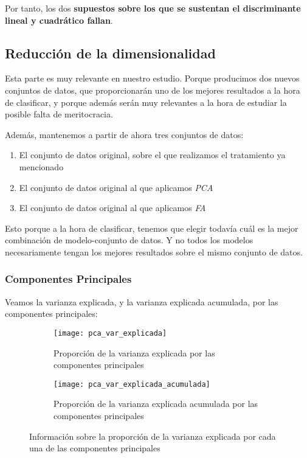 Por tanto, los dos \textbf{supuestos sobre los que se sustentan el discriminante lineal y cuadrático fallan}.


\subsection{Reducción de la dimensionalidad}

Esta parte es muy relevante en nuestro estudio. Porque producimos dos nuevos conjuntos de datos, que proporcionarán uno de los mejores resultados a la hora de clasificar, y porque además serán muy relevantes a la hora de estudiar la posible falta de meritocracia.

Además, mantenemos a partir de ahora tres conjuntos de datos:

\begin{enumerate}
    \item El conjunto de datos original, sobre el que realizamos el tratamiento ya mencionado
    \item El conjunto de datos original al que aplicamos \textit{PCA}
    \item El conjunto de datos original al que aplicamos \textit{FA}
\end{enumerate}

Esto porque a la hora de clasificar, tenemos que elegir todavía cuál es la mejor combinación de modelo-conjunto de datos. Y no todos los modelos necesariamente tengan los mejores resultados sobre el mismo conjunto de datos.

\subsubsection{Componentes Principales}

Veamos la varianza explicada, y la varianza explicada acumulada, por las componentes principales:

\begin{figure}[H]
    \centering
    \begin{subfigure}{0.45\textwidth}
        \texttt{[image: pca\_var\_explicada]}
        \caption{Proporción de la varianza explicada por las componentes principales}
    \end{subfigure}
    \begin{subfigure}{0.45\textwidth}
        \texttt{[image: pca\_var\_explicada\_acumulada]}
        \caption{Proporción de la varianza explicada acumulada por las componentes principales}
    \end{subfigure}

    \caption{Información sobre la proporción de la varianza explicada por cada una de las componentes principales}
\end{figure}

